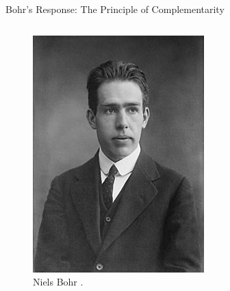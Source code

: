 \begin{frame}{Bohr's Response: The Principle of Complementarity}
\begin{columns}[T]
    \begin{column}{0.45\textwidth}
      \begin{figure}
        \centering
        \includegraphics[width=\linewidth, height=0.7\textheight, keepaspectratio]{images/NielsBohr.jpg}
        \caption{Niels Bohr \cite{IBohr}.}
      \end{figure}
    \end{column}
  \end{columns}

\end{frame}

